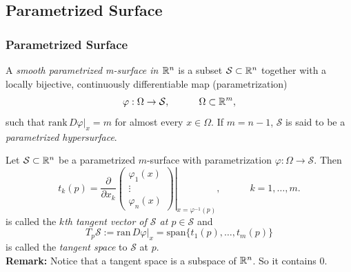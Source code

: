 \documentclass[10pt, t]{beamer}
\renewcommand{\emph}[1]{{\color{Turquoise3}\textsl{#1}}}
\newcommand{\nullspace}{~\\[15pt]}
\begin{document}


\subsection{Parametrized Surface}
\begin{frame}
    \frametitle{Parametrized Surface}
    A \emph{smooth parametrized m-surface in $\mathbb{R}^n$} is a subset $\mathcal{S}\subset\mathbb{R}^n$ together with a locally bijective, continuously differentiable map (parametrization)
    \[\varphi:\Omega\to\mathcal{S},\qquad\quad
        \Omega\subset\mathbb{R}^m,\]
    such that
   $\text{rank}\,D\varphi|_x=m$
    for almost every $x\in\Omega$. If $m=n-1$, $\mathcal{S}$ is said to be a \emph{parametrized hypersurface}.

    Let $\mathcal{S}\subset\mathbb{R}^n$ be a parametrized $m$-surface with parametrization $\varphi:\Omega\to\mathcal{S}$. Then
    \[t_k(p)=\frac{\partial}{\partial x_k}\left.\begin{pmatrix}
            \varphi_1(x) \\
            \vdots       \\
            \varphi_n(x)
        \end{pmatrix}\right|_{x=\varphi^{-1}(p)},\qquad\quad
        k=1,\ldots,m.\]
    is called the \emph{$k$th tangent vector of $\mathcal{S}$ at $p\in\mathcal{S}$} and
    \[T_p\mathcal{S}:=\text{ran}\,D\varphi|_x
        =\text{span}\{t_1(p),\ldots,t_m(p)\}\]
    is called the \emph{tangent space} to $\mathcal{S}$ at $p$.\\
    \textbf{Remark:} Notice that a tangent space is a subspace of $\mathbb{R}^n$. So it contains $0$. 
\end{frame}
\end{document}
